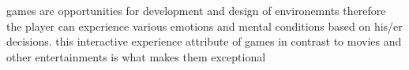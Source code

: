 games are opportunities for development and design of environemnts therefore the player can experience various emotions and mental conditions based on his/er decisions. this interactive experience attribute of games in contrast to movies and other entertainments is what makes them exceptional